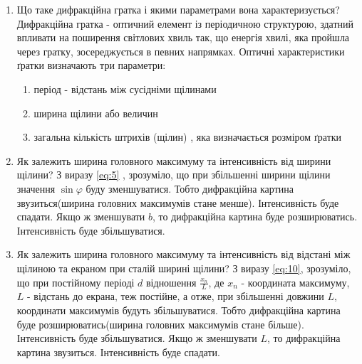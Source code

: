 \begin{enumerate}
    \item Що таке дифракційна гратка і якими параметрами вона характеризується?
    \bigbreak
    Дифракційна гратка - оптичний елемент із періодичною 
    структурою, здатний впливати на поширення світлових хвиль так,
    що енергія хвилі, яка пройшла через гратку, зосереджується 
    в певних напрямках.  Оптичні характеристики ґратки визначають три параметри:
    \begin{enumerate}
        \item період - відстань між сусідніми щілинами
        \item ширина щілини або величин
        \item загальна кількість штрихів (щілин) , яка визначається розміром ґратки
    \end{enumerate}    


    \item Як залежить ширина головного максимуму та інтенсивність від ширини щілини?
    \bigbreak
    З виразу  \ref{eq:5} , зрозуміло, що при збільшенні
    ширини щілини значення $\sin \varphi$ буду зменшуватися.
    Тобто дифракційна картина звузиться(ширина головних максимумів стане менше).
    Інтенсивність буде спадати.
    Якщо ж зменшувати $b$, то дифракційна 
    картина буде розширюватись. Інтенсивність буде збільшуватися.

    \item Як залежить ширина головного максимуму та інтенсивність від відстані між щілиною та екраном при сталій ширині щілини?
    \bigbreak
    З виразу  \ref{eq:10}, зрозуміло, що при постійному періоді $d$
    відношення $\frac{x_n}{L}$, де $x_n$ - координата максимуму,
    $L$ - відстань до екрана, теж постійне, а отже, при збільшенні довжини
    $L$, координати максимумів будуть збільшуватися. 
    Тобто дифракційна картина буде розширюватись(ширина головних максимумів стане більше).     
    Інтенсивність буде збільшуватися.
    Якщо ж зменшувати $L$, то дифракційна картина звузиться.
    Інтенсивність буде спадати.

    
\end{enumerate}